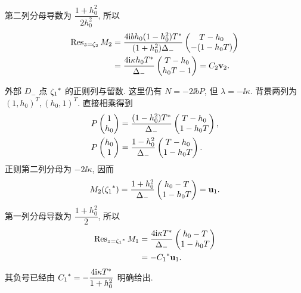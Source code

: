 第二列分母导数为 $\dfrac{1+h_0^2}{2h_0^2}$, 所以
\begin{equation*}
\begin{aligned}
\operatorname{Res}_{z=\zeta_2}M_2
&=\dfrac{4\mathrm{i} b h_0(1-h_0^2){T}^{*}}
{(1+h_0^2)\Delta_-}
\begin{pmatrix}T-h_0\\-(1-h_0T)\end{pmatrix}\\
&=\dfrac{4\mathrm{i}\kappa h_0{T}^{*}}{\Delta_-}
\begin{pmatrix}T-h_0\\h_0T-1\end{pmatrix}
=C_2\mathbf v_2.
\end{aligned}
\end{equation*}

\par\smallskip\noindent 外部 $D_-$ 点 ${\zeta_1}^{*}$ 的正则列与留数.\quad
这里仍有 $N=-2\ii bP$, 但 $\lambda=-\ii\kappa$.
背景两列为 $(1,h_0)^T,(h_0,1)^T$.
直接相乘得到
\begin{equation*}
\begin{aligned}
P\begin{pmatrix}1\\h_0\end{pmatrix}
&=\dfrac{(1-h_0^2){T}^{*}}{\Delta_-}
\begin{pmatrix}T-h_0\\1-h_0T\end{pmatrix},\\
P\begin{pmatrix}h_0\\1\end{pmatrix}
&=\dfrac{1-h_0^2}{\Delta_-}
\begin{pmatrix}T-h_0\\1-h_0T\end{pmatrix}.
\end{aligned}
\end{equation*}
正则第二列分母为 $-2\ii\kappa$, 因而
\begin{equation*}
M_2({\zeta_1}^{*})
=\dfrac{1+h_0^2}{\Delta_-}
\begin{pmatrix}h_0-T\\1-h_0T\end{pmatrix}
=\mathbf u_1.
\end{equation*}
第一列分母导数为 $\dfrac{1+h_0^2}{2}$, 所以
\begin{equation*}
\begin{aligned}
\operatorname{Res}_{z={\zeta_1}^{*}}M_1
&=\dfrac{4\mathrm{i}\kappa{T}^{*}}{\Delta_-}
\begin{pmatrix}h_0-T\\1-h_0T\end{pmatrix}\\
&=-{C_1}^{*}\mathbf u_1.
\end{aligned}
\end{equation*}
其负号已经由 ${C_1}^{*}=-\dfrac{4\mathrm{i}\kappa{T}^{*}}{1+h_0^2}$ 明确给出.

